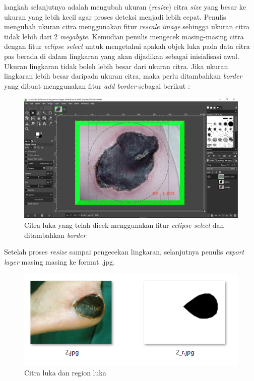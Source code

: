 langkah selanjutnya adalah mengubah ukuran (\emph{resize}) citra \emph{size} yang besar ke ukuran yang lebih kecil agar proses deteksi menjadi lebih cepat. Penulis mengubah ukuran citra menggunakan fitur \emph{rescale image} sehingga ukuran citra tidak lebih dari 2 \emph{megabyte}. Kemudian penulis mengecek masing-masing citra dengan fitur \emph{eclipse select} untuk mengetahui apakah objek luka pada data citra pas berada di dalam lingkaran yang akan dijadikan sebagai inisialisasi awal. Ukuran lingkaran tidak boleh lebih besar dari ukuran citra. Jika ukuran lingkaran lebih besar daripada ukuran citra, maka perlu ditambahkan \emph{border} yang dibuat menggunakan fitur \emph{add border} sebagai berikut :
\begin{figure}[H]
	\centering
	\includegraphics[width=1\textwidth]{gambar/circle_and_border}
	\caption{Citra luka yang telah dicek menggunakan fitur \emph{eclipse select} dan ditambahkan \emph{border}}
	\label{Gambar:circle_and_border}
\end{figure}

Setelah proses \emph{resize} sampai pengecekan lingkaran, selanjutnya penulis \emph{export layer} masing masing ke format .jpg.
\begin{figure}[H]
	\centering
	\includegraphics[width=1\textwidth]{gambar/citra_region}
	\caption{Citra luka dan region luka}
	\label{Gambar:citra_region}
\end{figure}




